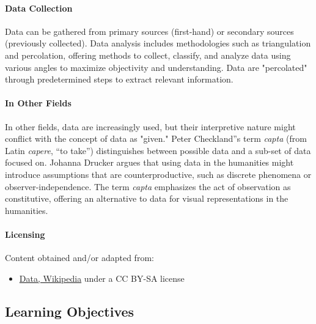 \paragraph{Data Collection}



Data can be gathered from primary sources (first-hand) or secondary sources (previously collected). Data analysis includes methodologies such as triangulation and percolation, offering methods to collect, classify, and analyze data using various angles to maximize objectivity and understanding. Data are "percolated" through predetermined steps to extract relevant information.



\paragraph{In Other Fields}



In other fields, data are increasingly used, but their interpretive nature might conflict with the concept of data as "given." Peter Checkland''s term \textit{capta} (from Latin \textit{capere}, “to take”) distinguishes between possible data and a sub-set of data focused on. Johanna Drucker argues that using data in the humanities might introduce assumptions that are counterproductive, such as discrete phenomena or observer-independence. The term \textit{capta} emphasizes the act of observation as constitutive, offering an alternative to data for visual representations in the humanities.



\paragraph{Licensing}



Content obtained and/or adapted from:



\begin{itemize}
    \item \href{https://en.wikipedia.org/wiki/Data}{Data, Wikipedia} under a CC BY-SA license
\end{itemize}

\subsection{Learning Objectives}

